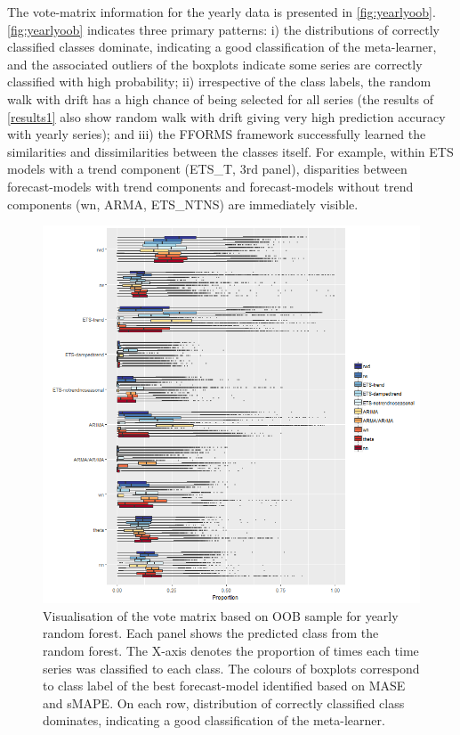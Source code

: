 \documentclass[11pt,a4paper,]{article}
\begin{document}
The vote-matrix information for the yearly data is presented in \autoref{fig:yearlyoob}. \autoref{fig:yearlyoob} indicates three primary patterns: i) the distributions of correctly classified classes dominate, indicating a good classification of the meta-learner, and the associated outliers of the boxplots indicate some series are correctly classified with high probability; ii) irrespective of the class labels, the random walk with drift has a high chance of being selected for all series (the results of \autoref{results1} also show random walk with drift giving very high prediction accuracy with yearly series); and iii) the FFORMS framework successfully learned the similarities and dissimilarities between the classes itself. For example, within ETS models with a trend component (ETS\_T, 3rd panel), disparities between forecast-models with trend components and forecast-models without trend components (wn, ARMA, ETS\_NTNS) are immediately visible.

\begin{figure}
\centering
\includegraphics{figures/yearlyoob-1.png}
\caption{\label{fig:yearlyoob}Visualisation of the vote matrix based on OOB sample for yearly random forest. Each panel shows the predicted class from the random forest. The X-axis denotes the proportion of times each time series was classified to each class. The colours of boxplots correspond to class label of the best forecast-model identified based on MASE and sMAPE. On each row, distribution of correctly classified class dominates, indicating a good classification of the meta-learner.}
\end{figure}
\end{document}
